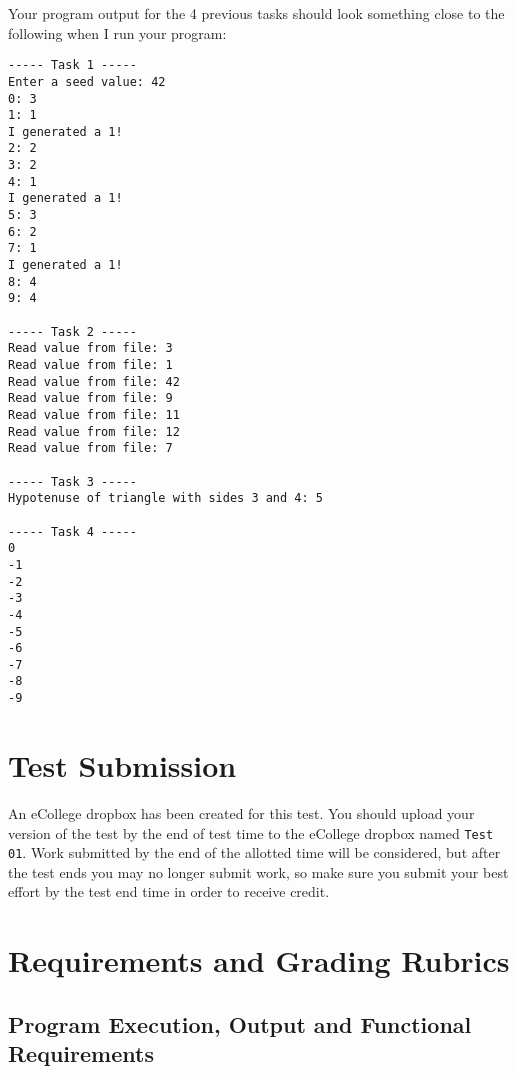 \documentclass[11pt]{article}
\begin{document}
Your program output for the 4 previous tasks should look something
close to the following when I run your program:

\begin{verbatim}
----- Task 1 -----
Enter a seed value: 42
0: 3
1: 1
I generated a 1!
2: 2
3: 2
4: 1
I generated a 1!
5: 3
6: 2
7: 1
I generated a 1!
8: 4
9: 4

----- Task 2 -----
Read value from file: 3
Read value from file: 1
Read value from file: 42
Read value from file: 9
Read value from file: 11
Read value from file: 12
Read value from file: 7

----- Task 3 -----
Hypotenuse of triangle with sides 3 and 4: 5

----- Task 4 -----
0
-1
-2
-3
-4
-5
-6
-7
-8
-9
\end{verbatim}

\section*{Test Submission}
\label{sec-3}

An eCollege dropbox has been created for this test.  You should upload
your version of the test by the end of test time to the eCollege
dropbox named \verb~Test 01~.  Work submitted by the end of the allotted
time will be considered, but after the test ends you may no longer
submit work, so make sure you submit your best effort by the test end
time in order to receive credit.
\section*{Requirements and Grading Rubrics}
\label{sec-4}

\subsection*{Program Execution, Output and Functional Requirements}
\label{sec-4-1}
\end{document}
